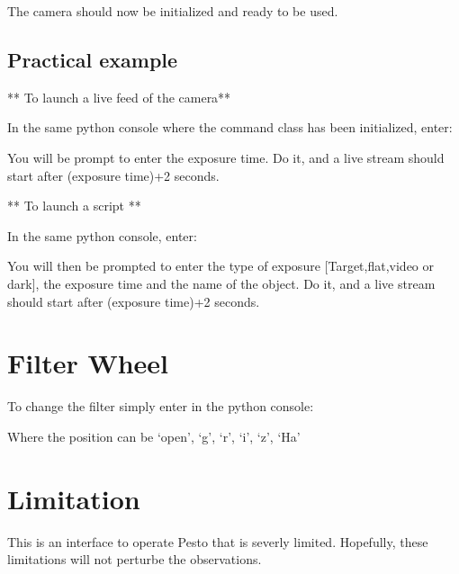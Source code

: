 \documentclass[letterpaper,10pt,english]{sphinxmanual}
\begin{document}
The camera should now be initialized and ready to be used.


\section{Practical example}
\label{\detokenize{start:practical-example}}
** To launch a live feed of the camera**

In the same python console where the command class has been initialized, enter:

%
\begin{sphinxVerbatim}[commandchars=\\\{\}]
\end{sphinxVerbatim}

You will be prompt to enter the exposure time. Do it, and a live stream should start after (exposure time)+2 seconds.

** To launch a script **

In the same python console, enter:

%
\begin{sphinxVerbatim}[commandchars=\\\{\}]
\end{sphinxVerbatim}

You will then be prompted to enter the type of exposure {[}Target,flat,video or dark{]}, the exposure time and the name of the object. Do it, and a live stream should start after (exposure time)+2 seconds.


\chapter{Filter Wheel}
\label{\detokenize{filter:filter-wheel}}\label{\detokenize{filter::doc}}
To change the filter simply enter in the python console:

%
\begin{sphinxVerbatim}[commandchars=\\\{\}]
\end{sphinxVerbatim}

Where the position can be ‘open’, ‘g’, ‘r’, ‘i’, ‘z’, ‘Ha’


\chapter{Limitation}
\label{\detokenize{limitation:limitation}}\label{\detokenize{limitation::doc}}
This is an interface to operate Pesto that is severly limited. Hopefully, these limitations will not perturbe the observations.
\end{document}
